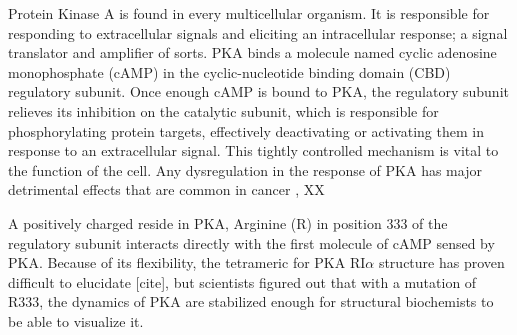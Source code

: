 \documentclass[12pt]{ucsddissertation}
\begin{document}
\begin{dissertationintroduction}
Protein Kinase A is found in every multicellular organism. It is responsible for responding to extracellular signals and eliciting an intracellular response; a signal translator and amplifier of sorts. PKA binds a molecule named cyclic adenosine monophosphate (cAMP) in the cyclic-nucleotide binding domain (CBD) regulatory subunit. Once enough cAMP is bound to PKA, the regulatory subunit relieves its inhibition on the catalytic subunit, which is responsible for phosphorylating protein targets, effectively deactivating or activating them in response to an extracellular signal. This tightly controlled mechanism is vital to the function of the cell. Any dysregulation in the response of PKA has major detrimental effects that are common in cancer \cite{Caretta2011}, XX

A positively charged reside in PKA, Arginine (R) in position 333 of the regulatory subunit interacts directly with the first molecule of cAMP sensed by PKA. Because of its flexibility, the tetrameric for PKA RI$\alpha$ structure has proven difficult to elucidate [cite], but scientists figured out that with a mutation of R333, the dynamics of PKA are stabilized enough for structural biochemists to be able to visualize it.


\end{dissertationintroduction}
\end{document}
